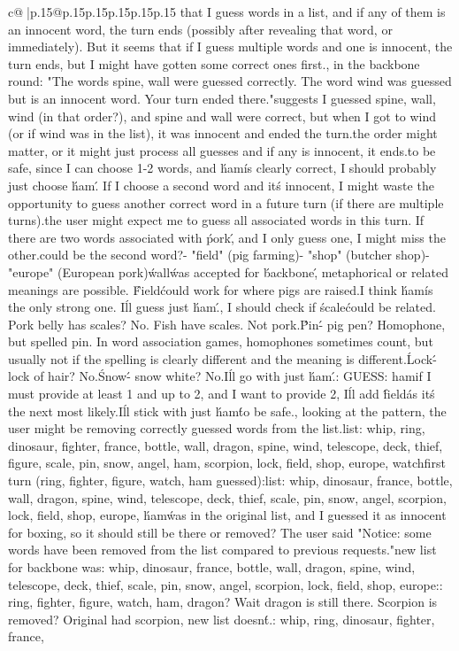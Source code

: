 \documentclass{article}
\begin{document}
{\begin{supertabular}{c@{$\;$}|p{.15\linewidth}@{}p{.15\linewidth}p{.15\linewidth}p{.15\linewidth}p{.15\linewidth}p{.15\linewidth}}
{{{that I guess words in a list, and if any of them is an innocent word, the turn ends (possibly after revealing that word, or immediately). But it seems that if I guess multiple words and one is innocent, the turn ends, but I might have gotten some correct ones first.\n\nActually, in the backbone round: "The words spine, wall were guessed correctly. The word wind was guessed but is an innocent word. Your turn ended there."\n\nThis suggests I guessed spine, wall, wind (in that order?), and spine and wall were correct, but when I got to wind (or if wind was in the list), it was innocent and ended the turn.\n\nSo the order might matter, or it might just process all guesses and if any is innocent, it ends.\n\nBut to be safe, since I can choose 1-2 words, and \'ham\' is clearly correct, I should probably just choose \'ham\'. If I choose a second word and it\'s innocent, I might waste the opportunity to guess another correct word in a future turn (if there are multiple turns).\n\nBut the user might expect me to guess all associated words in this turn. If there are two words associated with \'pork\', and I only guess one, I might miss the other.\n\nWhat could be the second word?\n- "field" (pig farming)\n- "shop" (butcher shop)\n- "europe" (European pork)\n\nGiven \'wall\' was accepted for \'backbone\', metaphorical or related meanings are possible. \'Field\' could work for where pigs are raised.\n\nBut I think \'ham\' is the only strong one. I\'ll guess just \'ham\'.\n\nWait, I should check if \'scale\' could be related. Pork belly has scales? No. Fish have scales. Not pork.\n\n\'Pin\' - pig pen? Homophone, but spelled pin. In word association games, homophones sometimes count, but usually not if the spelling is clearly different and the meaning is different.\n\n\'Lock\' - lock of hair? No.\n\n\'Snow\' - snow white? No.\n\nSo I\'ll go with just \'ham\'.\n\nFormat: GUESS: ham\n\nOr if I must provide at least 1 and up to 2, and I want to provide 2, I\'ll add \'field\' as it\'s the next most likely.\n\nBut I\'ll stick with just \'ham\' to be safe.\n\nActually, looking at the pattern, the user might be removing correctly guessed words from the list.\nOriginal list: whip, ring, dinosaur, fighter, france, bottle, wall, dragon, spine, wind, telescope, deck, thief, figure, scale, pin, snow, angel, ham, scorpion, lock, field, shop, europe, watch\n\nAfter first turn (ring, fighter, figure, watch, ham guessed):\nNew list: whip, dinosaur, france, bottle, wall, dragon, spine, wind, telescope, deck, thief, scale, pin, snow, angel, scorpion, lock, field, shop, europe\n\nWait, \'ham\' was in the original list, and I guessed it as innocent for boxing, so it should still be there or removed? The user said "Notice: some words have been removed from the list compared to previous requests."\nThe new list for backbone was: whip, dinosaur, france, bottle, wall, dragon, spine, wind, telescope, deck, thief, scale, pin, snow, angel, scorpion, lock, field, shop, europe\n\nComparing:\nRemoved: ring, fighter, figure, watch, ham, dragon? Wait dragon is still there. Scorpion is removed? Original had scorpion, new list doesn\'t.\n\nOriginal: whip, ring, dinosaur, fighter, france, }}}
\end{supertabular}}
\end{document}

